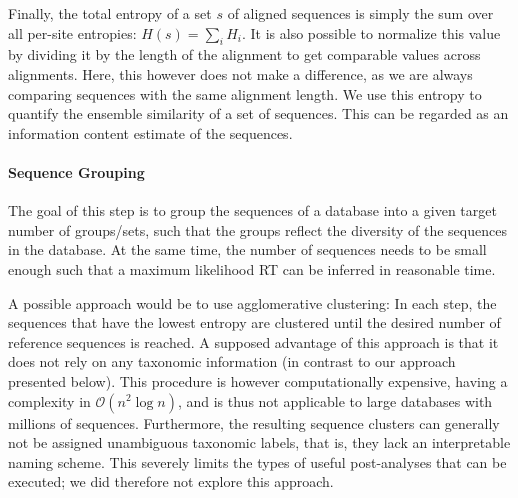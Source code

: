 Finally, the total entropy of a set $s$ of aligned sequences is simply the sum over all per-site entropies:
$H(s) = \sum_i H_i$.
It is also possible to normalize this value by dividing it by the length of the alignment
to get comparable values across alignments.
Here, this however does not make a difference, as we are always comparing sequences with the same alignment length.
We use this entropy to quantify the ensemble similarity of a set of sequences.
This can be regarded as an information content estimate of the sequences.



\paragraph{Sequence Grouping}
\label{ch:AutomaticTrees:sec:Methods:sub:PhAT:par:SequenceGrouping}

The goal of this step is to group the sequences of a database into a given target number of groups/sets,
such that the groups reflect the diversity of the sequences in the database.
At the same time, the number of sequences needs to be small enough
such that a maximum likelihood \ac{RT} can be inferred in reasonable time.

A possible approach would be to use agglomerative clustering:
In each step, the sequences that have the lowest entropy are clustered
until the desired number of reference sequences is reached.
A supposed advantage of this approach is that it does not rely on any taxonomic information
(in contrast to our approach presented below).
This procedure is however computationally expensive, having a complexity in $\mathcal{O}(n^2\log n)$,
and is thus not applicable to large databases with millions of sequences.
Furthermore, the resulting sequence clusters can generally not be assigned unambiguous taxonomic labels,
that is, they lack an interpretable naming scheme.
This severely limits the types of useful post-analyses that can be executed;
we did therefore not explore this approach.

